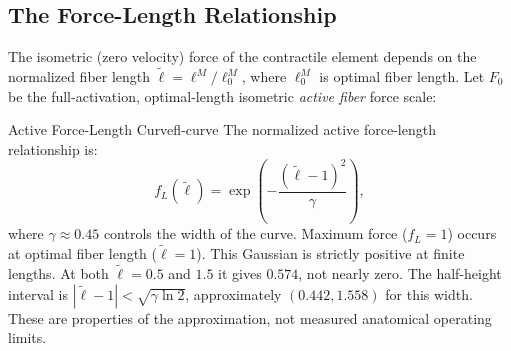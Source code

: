 \begin{center}
\end{center}

\subsection{The Force-Length Relationship}

The isometric (zero velocity) force of the contractile element depends on the
normalized fiber length $\tilde{\ell} = \ell^M / \ell_0^M$, where
$\ell_0^M$ is optimal fiber length. Let $F_0$ be the full-activation,
optimal-length isometric \emph{active fiber} force scale:

\begin{definition}{Active Force-Length Curve}{fl-curve}
  The normalized active force-length relationship is:
  \begin{equation}
    f_L(\tilde{\ell}) = \exp\!\left(-\frac{(\tilde{\ell} - 1)^2}{\gamma}\right),
    \label{eq:ch3:force-length}
  \end{equation}
  where $\gamma \approx 0.45$ \cite{Thelen2003} controls the width of the
  curve. Maximum force ($f_L = 1$) occurs at optimal fiber length ($\tilde{\ell} = 1$).
  This Gaussian is strictly positive at finite lengths. At both
  $\tilde{\ell}=0.5$ and $1.5$ it gives $0.574$, not nearly zero.
  The half-height interval is
  $|\tilde{\ell}-1|<\sqrt{\gamma\ln 2}$, approximately $(0.442,1.558)$
  for this width. These are properties of the approximation, not measured
  anatomical operating limits.
\end{definition}


